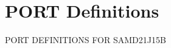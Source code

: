 \hypertarget{group___s_a_m_d21_j15_b__port}{}\section{P\+O\+RT Definitions}
\label{group___s_a_m_d21_j15_b__port}
P\+O\+RT D\+E\+F\+I\+N\+I\+T\+I\+O\+NS F\+OR S\+A\+M\+D21\+J15B 